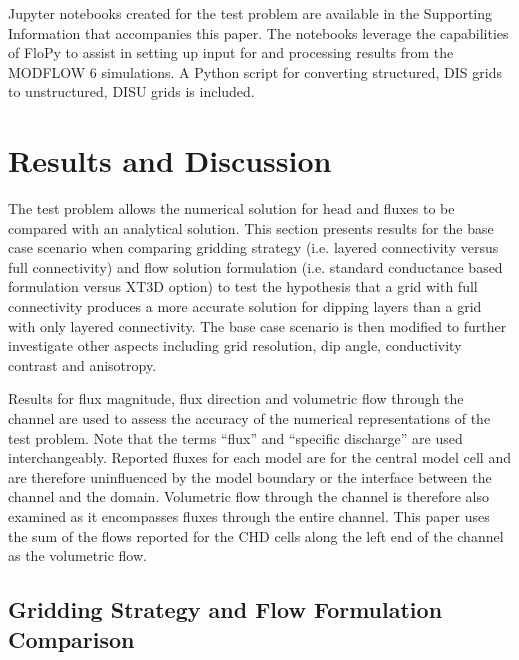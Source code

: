 \documentclass{article}
\begin{document}
Jupyter notebooks created for the test problem are available in the Supporting Information that accompanies this paper. The notebooks leverage the capabilities of FloPy \citep{bakker2016scripting, hughes2023flopy} to assist in setting up input for and processing results from the MODFLOW 6 simulations. A Python script for converting structured, DIS grids to unstructured, DISU grids is included.

\section{Results and Discussion}

The test problem allows the numerical solution for head and fluxes to be compared with an analytical solution. This section presents results for the base case scenario when comparing gridding strategy (i.e. layered connectivity versus full connectivity) and flow solution formulation (i.e. standard conductance based formulation versus XT3D option) to test the hypothesis that a grid with full connectivity produces a more accurate solution for dipping layers than a grid with only layered connectivity. The base case scenario is then modified to further investigate other aspects including grid resolution, dip angle, conductivity contrast and anisotropy. 

Results for flux magnitude, flux direction and volumetric flow through the channel are used to assess the accuracy of the numerical representations of the test problem. Note that the terms ``flux''  and ``specific discharge'' are used interchangeably. Reported fluxes for each model are for the central model cell and are therefore uninfluenced by the model boundary or the interface between the channel and the domain. Volumetric flow through the channel is therefore also examined as it encompasses fluxes through the entire channel. This paper uses the sum of the flows reported for the CHD cells along the left end of the channel as the volumetric flow. 

\subsection{Gridding Strategy and Flow Formulation Comparison}
\end{document}
